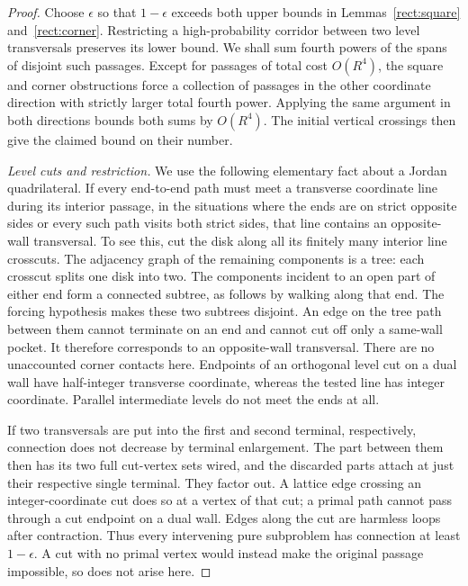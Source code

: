 \begin{proof}
Choose $\epsilon$ so that $1-\epsilon$ exceeds both upper bounds in
Lemmas~\ref{rect:square} and~\ref{rect:corner}. Restricting a high-probability
corridor between two level transversals preserves its lower bound.
We shall sum fourth powers of the spans of disjoint such passages.
Except for passages of total cost $O(R^4)$, the square and corner
obstructions force a collection of passages in the other coordinate
direction with strictly larger total fourth power. Applying the same
argument in both directions bounds both sums by $O(R^4)$. The initial
vertical crossings then give the claimed bound on their number.

\smallskip\noindent
\emph{Level cuts and restriction.}
We use the following elementary fact about a Jordan quadrilateral.  If
every end-to-end path must meet a transverse coordinate line during its
interior passage, in the situations where the ends are on strict
opposite sides or every such path visits both strict sides, that line
contains an opposite-wall transversal.  To see this, cut the disk along
all its finitely many interior line crosscuts.  The adjacency graph of
the remaining components is a tree: each crosscut splits one disk into
two.  The components incident to an open part of either end form a
connected subtree, as follows by walking along that end.  The forcing
hypothesis makes these two subtrees disjoint.  An edge on the tree path
between them cannot terminate on an end and cannot cut off only a
same-wall pocket.  It therefore corresponds to an opposite-wall
transversal.  There are no unaccounted corner contacts here.  Endpoints
of an orthogonal level cut on a dual wall have half-integer transverse
coordinate, whereas the tested line has integer coordinate.  Parallel
intermediate levels do not meet the ends at all.

If two transversals are put into the first and second terminal,
respectively, connection does not decrease by terminal enlargement.  The part
between them then has its two full cut-vertex sets wired, and the
discarded parts attach at just their respective single terminal.  They
factor out.  A lattice edge crossing an integer-coordinate cut does so
at a vertex of that cut; a primal path cannot pass through a cut endpoint
on a dual wall.  Edges along the cut are harmless loops after contraction.
Thus every intervening pure subproblem has connection at least
$1-\epsilon$.  A cut with no primal vertex would instead make the
original passage impossible, so does not arise here.


\end{proof}
